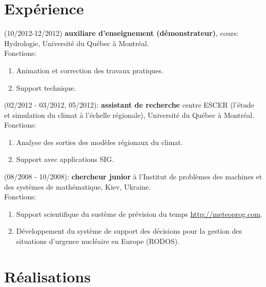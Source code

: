 \documentclass[letterpaper]{article}
\renewenvironment{itemize}{
  \begin{list}{}{
    \setlength{\leftmargin}{1.5em}
  }
}{
  \end{list}
}
\begin{document}
\section*{Expérience}
\begin{itemize}
  \item (10/2012-12/2012)
  \textbf{auxiliare d'enseignement (démonstrateur)}, cours: Hydrologie,
  Université du Québec à Montréal.\\
  Fonctions:
  \begin{enumerate}
    \item Animation et correction des travaux pratiques.
    \item Support technique.
  \end{enumerate}
   
  \item (02/2012 - 03/2012, 05/2012):
  \textbf{assistant de recherche} centre ESCER (l'étude et simulation du
  climat à l'échelle régionale), Université du Québec à Montréal.\\
  Fonctions:
  \begin{enumerate}
    \item Analyse des sorties des modèles régionaux du climat.
    \item Support avec applications SIG.
  \end{enumerate}


  \item (08/2008 - 10/2008): 
   \textbf{chercheur junior} à l'Institut de problèmes des machines et des
   systèmes de mathématique, Kiev, Ukraine. \\
  Fonctions:
  \begin{enumerate}
    \item Support scientifique du sustème de prévision du temps
    \href{http://meteoprog.com}{http://meteoprog.com}.
    \item Développement du système de support des décisions pour la
    gestion des situations d'urgence nucléaire en Europe (RODOS).
  \end{enumerate}
\end{itemize}
  


\section*{Réalisations}
\end{document}

